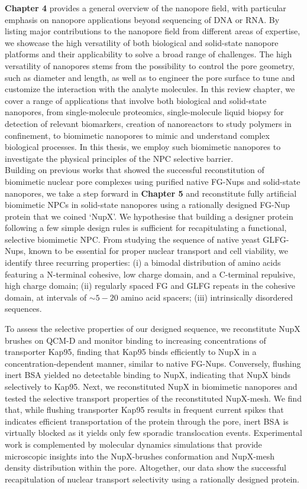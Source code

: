 \noindent \textbf{Chapter 4} provides a general overview of the nanopore field, with particular emphasis on nanopore applications beyond sequencing of DNA or RNA. By listing major contributions to the nanopore field from different areas of expertise, we showcase the high versatility of both biological and solid-state nanopore platforms and their applicability to solve a broad range of challenges. The high versatility of nanopores stems from the possibility to control the pore geometry, such as diameter and length, as well as to engineer the pore surface to tune and customize the interaction with the analyte molecules. 
In this review chapter, we cover a range of applications that involve both biological and solid-state nanopores, from single-molecule proteomics, single-molecule liquid biopsy for detection of relevant biomarkers, creation of nanoreactors to study polymers in confinement, to biomimetic nanopores to mimic and understand complex biological processes. In this thesis, we employ such biomimetic nanopores to investigate the physical principles of the NPC selective barrier. \\[0.5pt]

\noindent Building on previous works that showed the successful reconstitution of biomimetic nuclear pore complexes using purified native FG-Nups and solid-state nanopores, we take a step forward in \textbf{Chapter 5} and reconstitute fully artificial biomimetic NPCs in solid-state nanopores using a rationally designed FG-Nup protein that we coined `NupX'. We hypothesise that building a designer protein following a few simple design rules is sufficient for recapitulating a functional, selective biomimetic NPC. From studying the sequence of native yeast GLFG-Nups, known to be essential for proper nuclear transport and cell viability, we identify three recurring properties: (i) a bimodal distribution of amino acids featuring a N-terminal cohesive, low charge domain, and a C-terminal repulsive, high charge domain; (ii) regularly spaced FG and GLFG repeats in the cohesive domain, at intervals of $\sim5-20$ amino acid spacers; (iii) intrinsically disordered sequences. 

\noindent To assess the selective properties of our designed sequence, we reconstitute NupX brushes on QCM-D and monitor binding to increasing concentrations of transporter Kap95, finding that Kap95 binds efficiently to NupX in a concentration-dependent manner, similar to native FG-Nups. Conversely, flushing inert BSA yielded no detectable binding to NupX, indicating that NupX binds selectively to Kap95. Next, we reconstituted NupX in biomimetic nanopores and tested the selective transport properties of the reconstituted NupX-mesh. We find that, while flushing transporter Kap95 results in frequent current spikes that indicates efficient transportation of the protein through the pore, inert BSA is virtually blocked as it yields only few sporadic translocation events. Experimental work is complemented by molecular dynamics simulations that provide microscopic insights into the NupX-brushes conformation and NupX-mesh density distribution within the pore. Altogether, our data show the successful recapitulation of nuclear transport selectivity using a rationally designed protein.\\[0.5pt]

